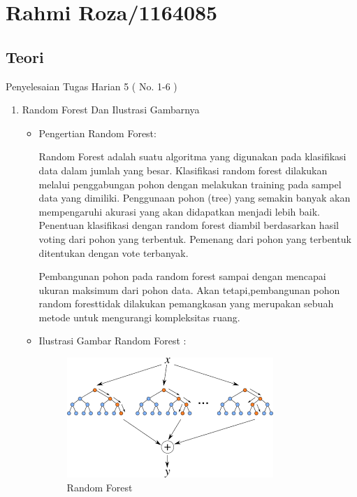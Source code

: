 \section{Rahmi Roza/1164085}
\subsection{Teori}
Penyelesaian Tugas Harian 5 ( No. 1-6 )
\begin{enumerate}
\item Random Forest Dan Ilustrasi Gambarnya
\begin{itemize}
\item Pengertian Random Forest:
\par Random Forest adalah suatu algoritma yang digunakan pada klasifikasi data dalam jumlah yang besar. Klasifikasi random forest dilakukan melalui penggabungan pohon  dengan melakukan training pada sampel data yang dimiliki. Penggunaan pohon (tree) yang semakin banyak akan mempengaruhi akurasi yang akan didapatkan menjadi lebih baik. Penentuan klasifikasi dengan random forest diambil berdasarkan hasil voting dari pohon yang terbentuk. Pemenang dari pohon yang terbentuk ditentukan dengan vote terbanyak. 
\par Pembangunan pohon  pada random forest sampai dengan mencapai ukuran maksimum dari pohon data. Akan tetapi,pembangunan pohon random foresttidak dilakukan pemangkasan  yang merupakan sebuah metode untuk mengurangi kompleksitas ruang.
\item Ilustrasi Gambar Random Forest :
\par

\begin{figure}[ht]
\centering
\includegraphics[scale=0.9]{figures/aku1.png}
\caption{Random Forest}
\label{contoh}
\end{figure}

\par
\end{itemize}


\end{enumerate}
